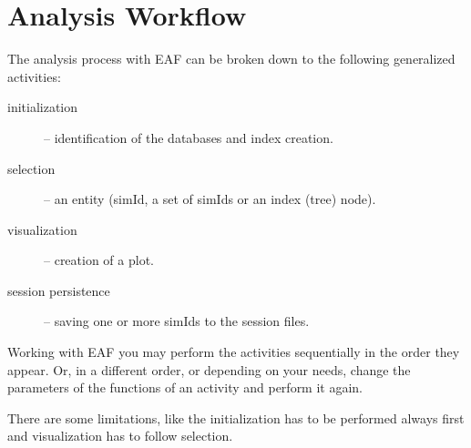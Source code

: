 \documentclass[10pt,a4paper]{article}
\begin{document}
\section{Analysis Workflow}

The analysis process with EAF can be broken down to the following generalized activities:

\begin{description}

\item[initialization] -- identification of the databases and index creation.

\item[selection] -- an entity (simId, a set of simIds or an index (tree) node).

\item[visualization] -- creation of a plot.

\item[session persistence] -- saving one or more simIds to the session files.

\end{description}


Working with EAF you may perform the activities sequentially in the order they appear. Or, in a different order, or depending on your needs, change the parameters of the functions of an activity and perform it again.

There are some limitations, like the initialization has to be performed always first and visualization has to follow selection.
\end{document}
